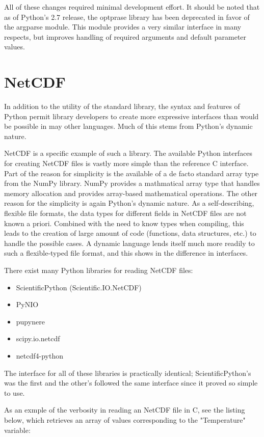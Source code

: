\documentclass[twocolumn]{article}
\begin{document}
All of these changes required minimal development effort. It should be noted
that as of Python's 2.7 release, the optprase library has been deprecated in
favor of the argparse module. This module provides a very similar interface
in many respects, but improves handling of required arguments and default
parameter values. \citep{REFERENCE!}

\section{NetCDF}
In addition to the utility of the standard library, the syntax and features of Python
permit library developers to create more expressive interfaces than would be possible
in may other languages. Much of this stems from Python's dynamic nature.

NetCDF is a specific example of such a library. The available Python interfaces for creating
NetCDF files is vastly more simple than the reference C interface. Part of the reason for
simplicity is the available of a de facto standard array type from the NumPy library. NumPy
provides a mathmatical array type that handles memory allocation and provides array-based
mathematical operations. The other reason for the simplicity is again Python's dynamic nature.
As a self-describing, flexible file formats, the data types for different fields in NetCDF
files are not known a priori. Combined with the need to know types when compiling, this
leads to the creation of large amount of code (functions, data structures, etc.) to handle
the possible cases.  A dynamic language lends itself much more readily to such a flexible-typed
file format, and this shows in the difference in interfaces.

There exist many Python libraries for reading NetCDF files:
\begin{itemize}
  \item ScientificPython (Scientific.IO.NetCDF)
  \item PyNIO
  \item pupynere
  \item scipy.io.netcdf
  \item netcdf4-python
\end{itemize}
The interface for all of these libraries is practically identical; ScientificPython's
was the first and the other's followed the same interface since it proved so
simple to use.

As an exmple of the verbosity in reading an NetCDF file in C, see the listing
below, which retrieves an array of values corresponding to the "Temperature"
variable:
\end{document}
